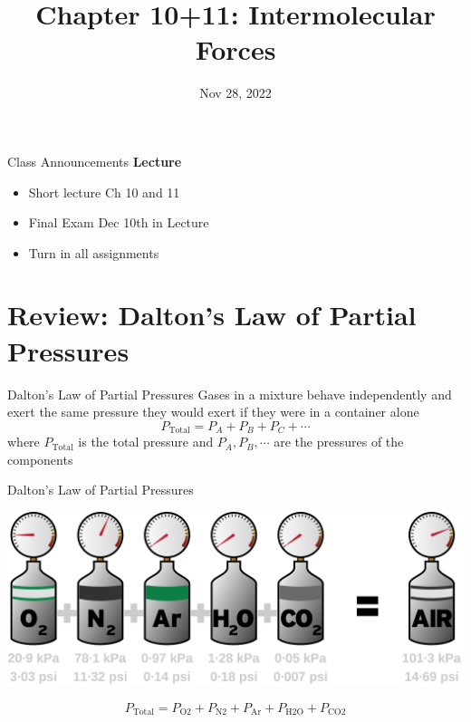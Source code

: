 \documentclass[11pt]{beamer}
\title{Chapter 10+11: Intermolecular Forces}
\institute{Chemistry Department, Cypress College}
\date{Nov 28, 2022}
\begin{document}
\begin{frame}
  \titlepage
\end{frame}

\begin{frame}{Class Announcements}
  \textbf{Lecture}
  \begin{itemize}
  \item Short lecture Ch 10 and 11
  \item Final Exam Dec 10th in Lecture
  \item Turn in all assignments
  \end{itemize}
\end{frame}

\section{Review: Dalton's Law of Partial Pressures}

\begin{frame}{Dalton's Law of Partial Pressures}
  Gases in a mixture behave independently and exert the same pressure they would
  exert if they were in a container alone
  \begin{equation}
    P_\text{Total} = P_A + P_B + P_C + \cdots
  \end{equation}
  where $P_\text{Total}$ is the total pressure and $P_A, P_B, \cdots$ are the
  pressures of the components
\end{frame}

\begin{frame}{Dalton's Law of Partial Pressures}
  \begin{center}
    \includegraphics[width=\linewidth]{dalton_partial}
  \end{center}
  \begin{equation}
    P_\text{Total} = P_\text{O2} + P_\text{N2} + P_\text{Ar}
    + P_\text{H2O} + P_\text{CO2}
    \nonumber
  \end{equation}
\end{frame}
\end{document}
